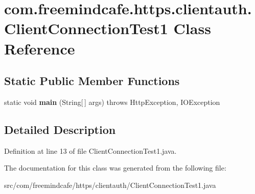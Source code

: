 \hypertarget{classcom_1_1freemindcafe_1_1https_1_1clientauth_1_1_client_connection_test1}{}\section{com.\+freemindcafe.\+https.\+clientauth.\+Client\+Connection\+Test1 Class Reference}
\label{classcom_1_1freemindcafe_1_1https_1_1clientauth_1_1_client_connection_test1}
\subsection*{Static Public Member Functions}
\begin{DoxyCompactItemize}
\item 
\hypertarget{classcom_1_1freemindcafe_1_1https_1_1clientauth_1_1_client_connection_test1_a6b4b955b7e594ff779adf287d2ba6f7d}{}static void {\bfseries main} (String\mbox{[}$\,$\mbox{]} args)  throws Http\+Exception, I\+O\+Exception    \label{classcom_1_1freemindcafe_1_1https_1_1clientauth_1_1_client_connection_test1_a6b4b955b7e594ff779adf287d2ba6f7d}

\end{DoxyCompactItemize}


\subsection{Detailed Description}


Definition at line 13 of file Client\+Connection\+Test1.\+java.



The documentation for this class was generated from the following file\+:\begin{DoxyCompactItemize}
\item 
src/com/freemindcafe/https/clientauth/Client\+Connection\+Test1.\+java\end{DoxyCompactItemize}
